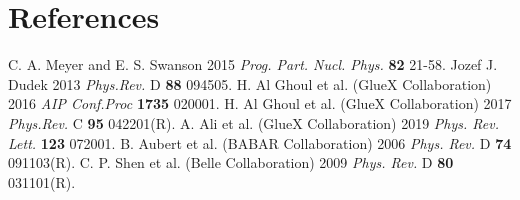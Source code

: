 \documentclass[a4paper]{jpconf}
\begin{document}
\section*{References}
\begin{thebibliography}{9}
 C. A. Meyer and E. S. Swanson 2015 {\it Prog. Part. Nucl. Phys.} {\bf 82} 21-58.
 Jozef J. Dudek 2013 {\it Phys.Rev.} D {\bf 88} 094505.
 H. Al Ghoul et al. (GlueX Collaboration) 2016 {\it AIP Conf.Proc} {\bf 1735} 020001.
 H. Al Ghoul et al. (GlueX Collaboration) 2017 {\it Phys.Rev.} C {\bf 95} 042201(R).
 A. Ali et al. (GlueX Collaboration) 2019 {\it Phys. Rev. Lett.} {\bf123} 072001.
 B. Aubert et al. (BABAR Collaboration) 2006 {\it Phys. Rev.} D {\bf 74} 091103(R).
 C. P. Shen et al. (Belle Collaboration) 2009 {\it Phys. Rev.} D {\bf 80} 031101(R).
\end{thebibliography}
\end{document}
